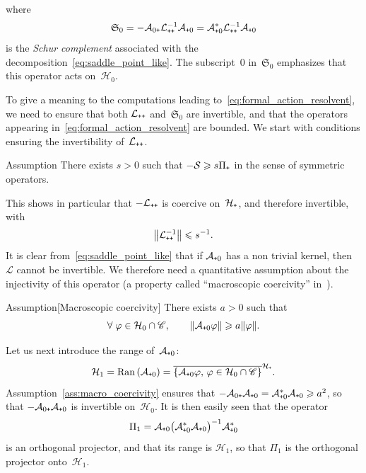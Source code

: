 \documentclass[AHL,Unicode,longabstracts,MathTools,published]{cedram}
\newcommand{\Ran}{\mathrm{Ran}}
\newcommand{\cL}{\mathcal{L}}
\newcommand{\cLs}{\mathcal{S}}
\newcommand{\cLa}{\mathcal{A}}
\newcommand{\cH}{\mathcal{H}}
\newcommand{\scrC}{\mathscr{C}}
\newcommand{\Schur}{\mathfrak{S}_0}
\newcommand{\subplus}{\textnormal{\texttt{+}}}
\renewcommand{\leq}{\leqslant}
\renewcommand{\geq}{\geqslant}
\renewcommand{\ge}{\geqslant}
\let\oldforall\forall
\renewcommand*{\forall}{\mathrel{\oldforall}}
\begin{document}
where
\[
\Schur = -\cLa_{0\subplus} \cL_{\subplus\subplus}^{-1} \cLa_{\subplus0} = \cLa_{\subplus0}^{*} \cL_{\subplus\subplus}^{-1} \cLa_{\subplus0}
\]
is the \emph{Schur complement} associated with the decomposition~\eqref{eq:saddle_point_like}. The subscript~0 in~$\Schur$ emphasizes that this operator acts on~$\cH_0$.

To give a meaning to the computations leading to~\eqref{eq:formal_action_resolvent}, we need to ensure that both $\cL_{\subplus\subplus}$ and~$\Schur$ are invertible, and that the operators appearing in~\eqref{eq:formal_action_resolvent} are bounded. We start with conditions ensuring the invertibility of~$\cL_{\subplus\subplus}$.

\begin{enonce}{Assumption}\label{ass:A_inv}
There exists $s > 0$ such that $-\cLs \ge s \Pi_{\subplus}$ in the sense of symmetric operators.
\end{enonce}

This shows in particular that $-\cL_{\subplus\subplus}$ is coercive on~$\cH_\subplus$, and therefore invertible, with
\[
\left\| \cL_{\subplus\subplus}^{-1} \right\| \leq s^{-1}.
\]
It is clear from~\eqref{eq:saddle_point_like} that if $\cLa_{\subplus0}$ has a non trivial kernel, then $\cL$ cannot be invertible. We therefore need a quantitative assumption about the injectivity of this operator (a property called ``macroscopic coercivity'' in~\cite{DMS15}).

\begin{enonce}{Assumption}[Macroscopic coercivity]\label{ass:macro_coercivity}
There exists $a > 0$ such that
\begin{equation}\label{eq:macro_coercivity_bound}
\forall \varphi \in \cH_{0} \cap \scrC, \qquad \|\cLa_{\subplus0} \varphi\| \geq a \|\varphi\|.
\end{equation}
\end{enonce}

Let us next introduce the range of~$\cLa_{\subplus 0}$:
\[
\cH_{1} = \Ran\left(\cLa_{\subplus 0}\right) = \overline{\left\{\cLa_{\subplus0} \varphi, \, \varphi \in \cH_{0} \cap \scrC \right\}}^{\cH_{\subplus}}.
\]
Assumption~\ref{ass:macro_coercivity} ensures that $-\cLa_{0\subplus} \cLa_{\subplus0} = \cLa_{\subplus0}^{*} \cLa_{\subplus0} \geq a^2$, so that $-\cLa_{0\subplus} \cLa_{\subplus0}$ is invertible on~$\cH_{0}$. It is then easily seen that the operator
\begin{equation}\label{eq:Pi_1}
\Pi_{1} = \cLa_{\subplus0} \big(\cLa_{\subplus0}^*\cLa_{\subplus0}\big)^{-1} \cLa_{\subplus0}^*
\end{equation}
is an orthogonal projector, and that its range is $\cH_{1}$, so that $\Pi_{1}$ is the orthogonal projector onto~$\cH_{1}$.
\end{document}
